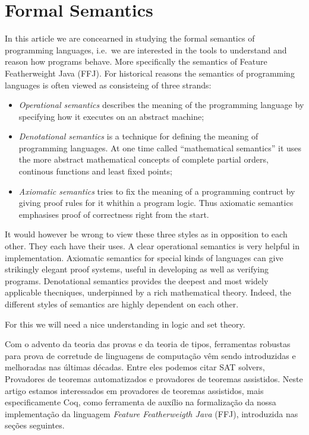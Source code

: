 \section{Formal Semantics} 
In this article we are concearned in studying the formal semantics of
programming languages, i.e.\ we are interested in the tools to understand and
reason how programs behave. More specifically the semantics of Feature
Featherweight Java (FFJ).  For historical reasons the semantics of programming
languages is often viewed as consisteing of three strands: 

\begin{itemize} 
    \item \textit{Operational semantics} describes the meaning of the
        programming language by specifying how it executes on an abstract machine;

    \item \textit{Denotational semantics} is a technique for defining the
    meaning of programming languages. At one time called ``mathematical
    semantics'' it uses the more abstract mathematical concepts of complete
    partial orders, continous functions and least fixed points; 

    \item \textit{Axiomatic semantics} tries to fix the meaning of a programming
        contruct by giving proof rules for it whithin a program logic. Thus
        axiomatic semantics emphasises proof of correctness right from the start.
\end{itemize}

It would however be wrong to view these three styles as in opposition to
each other. They each have their uses. A clear operational semantics is very
helpful in implementation. Axiomatic semantics for special kinds of
languages can give strikingly elegant proof systems, useful in developing as
well as verifying programs. Denotational semantics provides the deepest and
most widely applicable thecniques, underpinned by a rich mathematical
theory. Indeed, the different styles  of semantics are highly dependent on
each other. 

For this we will need a nice understanding in logic and set theory.

Com o advento da teoria das provas e da teoria de tipos\cite{martinlof},
ferramentas robustas para prova de corretude de linguagens de computação vêm
sendo introduzidas e melhoradas nas últimas décadas. Entre eles podemos citar
SAT solvers, Provadores de teoremas automatizados e provadores de teoremas
assistidos.  Neste artigo estamos interessados em provadores de teoremas
assistidos, mais especificamente Coq, como ferramenta de auxílio na formalização
da nossa implementação da linguagem \textit{Feature Featherweigth Java} (FFJ),
introduzida nas seções seguintes. 

